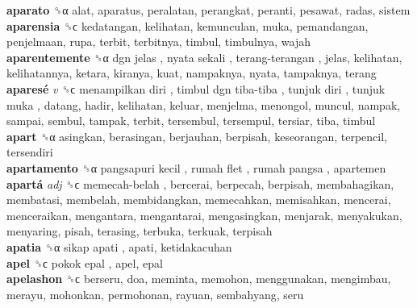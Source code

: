 \textbf{aparato} ␝α  alat, aparatus, peralatan, perangkat, peranti, pesawat, radas, sistem  \\
\textbf{aparensia} ␝ϲ  kedatangan, kelihatan, kemunculan, muka, pemandangan, penjelmaan, rupa, terbit, terbitnya, timbul, timbulnya, wajah  \\
\textbf{aparentemente} ␝α   dgn jelas ,  nyata sekali ,  terang-terangan , jelas, kelihatan, kelihatannya, ketara, kiranya, kuat, nampaknya, nyata, tampaknya, terang  \\
\textbf{aparesé} \emph{v}  ␝ϲ   menampilkan diri ,  timbul dgn tiba-tiba ,  tunjuk diri ,  tunjuk muka , datang, hadir, kelihatan, keluar, menjelma, menongol, muncul, nampak, sampai, sembul, tampak, terbit, tersembul, tersempul, tersiar, tiba, timbul  \\
\textbf{apart} ␝α  asingkan, berasingan, berjauhan, berpisah, keseorangan, terpencil, tersendiri  \\
\textbf{apartamento} ␝α   pangsapuri kecil ,  rumah flet ,  rumah pangsa , apartemen  \\
\textbf{apartá} \emph{adj}  ␝ϲ   memecah-belah , bercerai, berpecah, berpisah, membahagikan, membatasi, membelah, membidangkan, memecahkan, memisahkan, mencerai, menceraikan, mengantara, mengantarai, mengasingkan, menjarak, menyakukan, menyaring, pisah, terasing, terbuka, terkuak, terpisah  \\
\textbf{apatia} ␝α   sikap apati , apati, ketidakacuhan  \\
\textbf{apel} ␝ϲ   pokok epal , apel, epal  \\
\textbf{apelashon} ␝ϲ  berseru, doa, meminta, memohon, menggunakan, mengimbau, merayu, mohonkan, permohonan, rayuan, sembahyang, seru  \\
